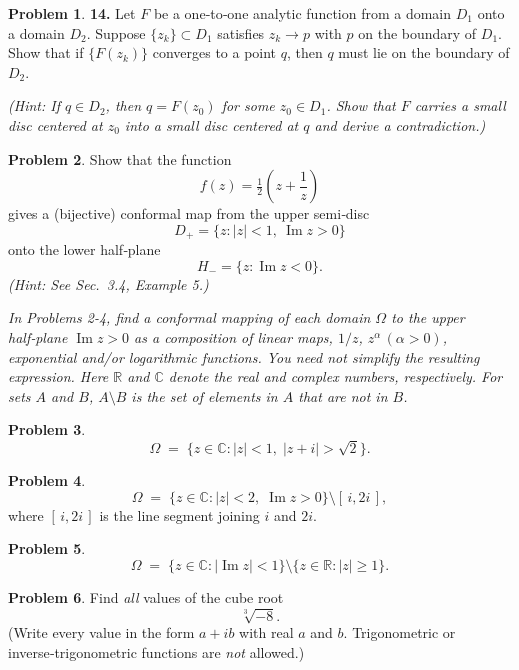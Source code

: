 \documentclass[10pt]{article}
\theoremstyle{definition} %
\newtheorem{problem}{Problem}
\theoremstyle{plain} %
\begin{document}
        \begin{problem}
        \textbf{14.} Let \(F\) be a one‑to‑one analytic function from a domain \(D_{1}\) onto a domain \(D_{2}\).  
        Suppose \(\{z_{k}\}\subset D_{1}\) satisfies \(z_{k}\to p\) with \(p\) on the boundary of \(D_{1}\).  
        Show that if \(\{F(z_{k})\}\) converges to a point \(q\), then \(q\) must lie on the boundary of \(D_{2}\).  
        
        \emph{(Hint: If \(q\in D_{2}\), then \(q=F(z_{0})\) for some \(z_{0}\in D_{1}\).  
        Show that \(F\) carries a small disc centered at \(z_{0}\) into a small disc centered at \(q\) and derive a contradiction.)}
        \end{problem}
        \begin{problem}
          Show that the function
          \[
            f(z)=\tfrac12\!\left(z+\frac1z\right)
          \]
          gives a (bijective) conformal map from the upper semi‑disc
          \[
            D_{+}=\{z:|z|<1,\ \operatorname{Im}z>0\}
          \]
          onto the lower half‑plane
          \[
            H_{-}=\{z:\operatorname{Im}z<0\}.
          \]
          \emph{(Hint: See Sec.\ 3.4, Example 5.)}
          \end{problem}
          
          \textit{In Problems 2-4, find a conformal mapping of each domain \(\Omega\) to the upper half‑plane \(\operatorname{Im}z>0\) as a composition of linear maps, \(1/z\), \(z^{\alpha}\,(\alpha>0)\), exponential and/or logarithmic functions. You need not simplify the resulting expression.  Here \(\mathbb{R}\) and \(\mathbb{C}\) denote the real and complex numbers, respectively.  For sets \(A\) and \(B\), \(A\setminus B\) is the set of elements in \(A\) that are not in \(B\).}
          
          \begin{problem}
          \[
            \Omega \;=\; \bigl\{z\in\mathbb{C} : |z|<1,\; |z+i|>\sqrt{2}\bigr\}.
          \]
          \end{problem}
          
          \begin{problem}
          \[
            \Omega \;=\; \bigl\{z\in\mathbb{C}: |z|<2,\; \operatorname{Im}z>0\bigr\}
                        \setminus [\,i,2i\,],
          \]
          where \([\,i,2i\,]\) is the line segment joining \(i\) and \(2i\).
          \end{problem}
          
          \begin{problem}
          \[
            \Omega \;=\; \bigl\{z\in\mathbb{C}: |\operatorname{Im}z|<1\bigr\}\setminus
                        \bigl\{z\in\mathbb{R}: |z|\ge 1\bigr\}.
          \]
          \end{problem}
          \begin{problem}
            Find \emph{all} values of the cube root
            \[
              \sqrt[3]{-8}.
            \]
            (Write every value in the form \(a+ib\) with real \(a\) and \(b\).  
            Trigonometric or inverse‑trigonometric functions are \emph{not} allowed.)
            \end{problem}
            
\end{document}
